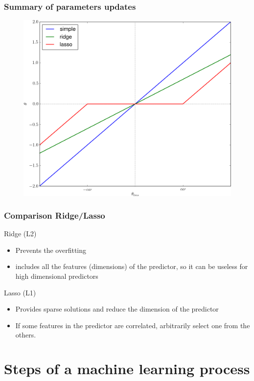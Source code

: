 \documentclass[handout, 10pt]{beamer}
\begin{document}
\begin{frame}
\frametitle{Summary of parameters updates}
\begin{figure}
\includegraphics[height=0.8\textheight]{./updates.png}
\end{figure}
\end{frame}

\begin{frame}
\frametitle{Comparison Ridge/Lasso}
\begin{exampleblock}{Ridge (L2)}
\begin{itemize}
\item Prevents the overfitting
\item includes all the features (dimensions) of the predictor, 
so it can be useless for high dimensional predictors
\end{itemize}
\end{exampleblock}
\pause
\begin{alertblock}{Lasso (L1)}
\begin{itemize}
\item Provides sparse solutions and reduce the dimension of the
predictor
\item If some features in the predictor are correlated, arbitrarily select
one from the others.
\end{itemize}
\end{alertblock}
\end{frame}


\section{Steps of a machine learning process}
\end{document}
